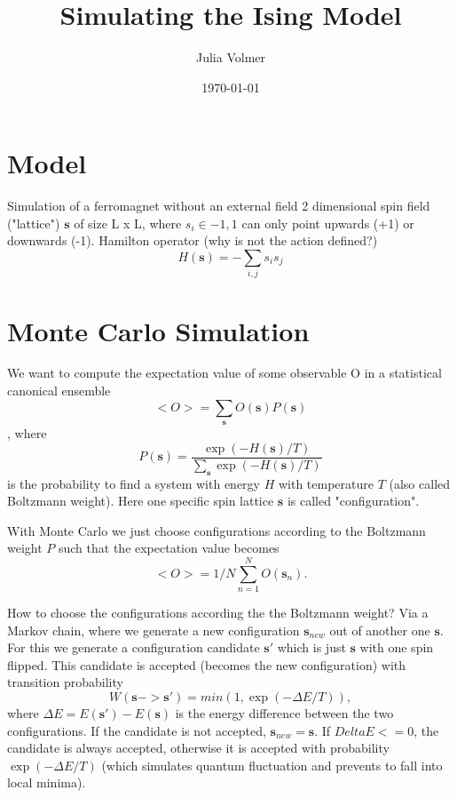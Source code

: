 \documentclass[a4paper,11pt,bibtotoc]{scrartcl}
\begin{document}
\title{Simulating the Ising Model}
\author{Julia Volmer}
\date{\today}
\maketitle



\section{Model}
Simulation of a ferromagnet without an external field
2 dimensional spin field ("lattice") $\textbf{s}$ of size L x L, where $s_i \in {-1, 1}$ can only point upwards (+1) or downwards (-1).
Hamilton operator (why is not the action defined?)
$$H(\textbf{s}) = - \sum_{i,j} s_i s_j$$

\section{Monte Carlo Simulation}
We want to compute the expectation value of some observable O in a statistical canonical ensemble
\begin{equation}
<O> = \sum_{\textbf{s}} O(\textbf{s}) P(\textbf{s})
\end{equation},
where
\begin{equation}
P(\textbf{s}) = \frac{\exp(-H(\textbf{s})/T)}{\sum_{\textbf{s}} \exp(-H(\textbf{s})/T)}
\end{equation}
is the probability to find a system with energy $H$ with temperature $T$ (also called Boltzmann weight). Here one specific spin lattice $\textbf{s}$ is called "configuration".

With Monte Carlo we just choose configurations according to the Boltzmann weight $P$ such that the expectation value becomes
\begin{equation}
<O> = 1/N \sum_{n=1}^N O(\textbf{s}_n).
\end{equation}

How to choose the configurations according the the Boltzmann weight? Via a Markov chain, where we generate a new configuration \(\textbf{s}_{new}\) out of another one \(\textbf{s}\).
For this we generate a configuration candidate $\textbf{s}'$  which is just $\textbf{s}$ with one spin flipped. This candidate is accepted (becomes the new configuration) with transition probability
\begin{equation}
W(\textbf{s} -> \textbf{s}') = min (1, \exp(-\Delta E / T)),
\end{equation}
where \(\Delta E = E(\textbf{s}') - E(\textbf{s})\) is the energy difference between the two configurations.
If the candidate is not accepted, $\textbf{s}_{new} = \textbf{s}$. If $Delta E <= 0$, the candidate is always accepted, otherwise it is accepted with probability $\exp(-\Delta E / T)$ (which simulates quantum fluctuation and prevents to fall into local minima).
\end{document}
